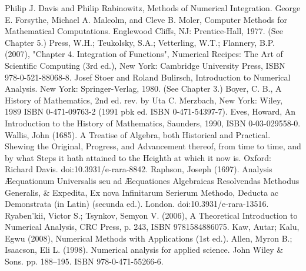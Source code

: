 \documentclass[twoside,twocolumn]{article}
\begin{document}
\begin{CJK*}{UTF8}{gkai}
\newpage
\renewcommand\refname{参考文献}
\begin{thebibliography}{99}
Philip J. Davis and Philip Rabinowitz, Methods of Numerical Integration.
George E. Forsythe, Michael A. Malcolm, and Cleve B. Moler, Computer Methods for Mathematical Computations. Englewood Cliffs, NJ: Prentice-Hall, 1977. (See Chapter 5.)
Press, W.H.; Teukolsky, S.A.; Vetterling, W.T.; Flannery, B.P. (2007), "Chapter 4. Integration of Functions", Numerical Recipes: The Art of Scientific Computing (3rd ed.), New York: Cambridge University Press, ISBN 978-0-521-88068-8.
Josef Stoer and Roland Bulirsch, Introduction to Numerical Analysis. New York: Springer-Verlag, 1980. (See Chapter 3.)
Boyer, C. B., A History of Mathematics, 2nd ed. rev. by Uta C. Merzbach, New York: Wiley, 1989 ISBN 0-471-09763-2 (1991 pbk ed. ISBN 0-471-54397-7).
Eves, Howard, An Introduction to the History of Mathematics, Saunders, 1990, ISBN 0-03-029558-0.
 Wallis, John (1685). A Treatise of Algebra, both Historical and Practical. Shewing the Original, Progress, and Advancement thereof, from time to time, and by what Steps it hath attained to the Heighth at which it now is. Oxford: Richard Davis. doi:10.3931/e-rara-8842.
Raphson, Joseph (1697). Analysis Æequationum Universalis seu ad Æequationes Algebraicas Resolvendas Methodus Generalis, \& Expedita, Ex nova Infinitarum Serierum Methodo, Deducta ac Demonstrata (in Latin) (secunda ed.). London. doi:10.3931/e-rara-13516.
Ryaben'kii, Victor S.; Tsynkov, Semyon V. (2006), A Theoretical Introduction to Numerical Analysis, CRC Press, p. 243, ISBN 9781584886075.
Kaw, Autar; Kalu, Egwu (2008), Numerical Methods with Applications (1st ed.).
Allen, Myron B.; Isaacson, Eli L. (1998). Numerical analysis for applied science. John Wiley \& Sons. pp. 188–195. ISBN 978-0-471-55266-6.
\end{thebibliography} 

\end{CJK*}
\end{document}

